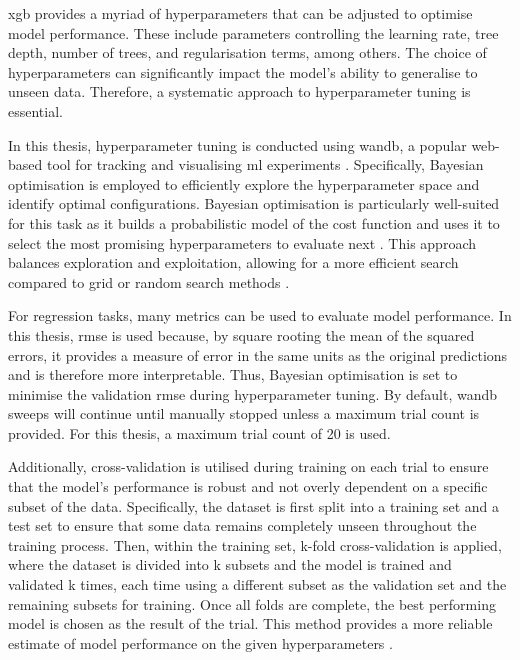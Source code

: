 \acrshort{xgb} provides a myriad of hyperparameters that can be adjusted to optimise model performance. These include parameters controlling the learning rate, tree depth, number of trees, and regularisation terms, among others. The choice of hyperparameters can significantly impact the model's ability to generalise to unseen data. Therefore, a systematic approach to hyperparameter tuning is essential. 

In this thesis, hyperparameter tuning is conducted using \acrfull{wandb}, a popular web-based tool for tracking and visualising \acrshort{ml} experiments . Specifically, Bayesian optimisation is employed to efficiently explore the hyperparameter space and identify optimal configurations. Bayesian optimisation is particularly well-suited for this task as it builds a probabilistic model of the cost function and uses it to select the most promising hyperparameters to evaluate next . This approach balances exploration and exploitation, allowing for a more efficient search compared to grid or random search methods . 

For regression tasks, many metrics can be used to evaluate model performance. In this thesis, \acrfull{rmse} is used because, by square rooting the mean of the squared errors, it provides a measure of error in the same units as the original predictions and is therefore more interpretable. Thus, Bayesian optimisation is set to minimise the validation \acrshort{rmse} during hyperparameter tuning. By default, \acrshort{wandb} sweeps will continue until manually stopped unless a maximum trial count is provided. For this thesis, a maximum trial count of 20 is used. 

Additionally, cross-validation is utilised during training on each trial to ensure that the model's performance is robust and not overly dependent on a specific subset of the data. Specifically, the dataset is first split into a training set and a test set to ensure that some data remains completely unseen throughout the training process. Then, within the training set, k-fold cross-validation is applied, where the dataset is divided into k subsets and the model is trained and validated k times, each time using a different subset as the validation set and the remaining subsets for training. Once all folds are complete, the best performing model is chosen as the result of the trial. This method provides a more reliable estimate of model performance on the given hyperparameters .

